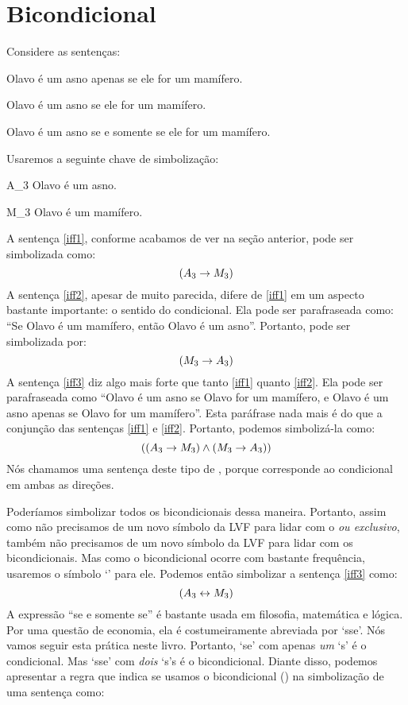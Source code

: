\section{Bicondicional}
Considere as sentenças:
	\begin{earg}
		\item[\ex{iff1}] Olavo é um asno apenas se ele for um mamífero.
		\item[\ex{iff2}] Olavo é um asno se ele for um mamífero.
		\item[\ex{iff3}] Olavo é um asno se e somente se ele for um mamífero.
	\end{earg}
Usaremos a seguinte chave de simbolização:
	\begin{ekey}
		\item[A_3] Olavo é um asno.
		\item[M_3] Olavo é um mamífero.
	\end{ekey}
A sentença \ref{iff1}, conforme acabamos de ver na seção anterior, pode ser simbolizada como:
$$(A_3 \rightarrow M_3)$$
A sentença \ref{iff2}, apesar de muito parecida, difere de \ref{iff1} em um aspecto bastante importante:
o sentido do condicional.
Ela pode ser parafraseada como:
``Se Olavo é um mamífero, então Olavo é um asno''.
Portanto, pode ser simbolizada por:
$$(M_3 \rightarrow A_3)$$
A sentença \ref{iff3} diz algo mais forte que tanto \ref{iff1} quanto \ref{iff2}.
Ela pode ser parafraseada como ``Olavo é um asno se Olavo for um mamífero, e Olavo é um asno apenas se Olavo for um mamífero''.
Esta paráfrase nada mais é do que a conjunção das sentenças \ref{iff1} e \ref{iff2}.
Portanto, podemos simbolizá-la como:
$$((A_3 \rightarrow M_3) \wedge (M_3 \rightarrow A_3))$$
Nós chamamos uma sentença deste tipo de , porque corresponde ao condicional em ambas as direções.

Poderíamos simbolizar todos os bicondicionais dessa maneira.
Portanto, assim como não precisamos de um novo símbolo da LVF para lidar com o \emph{ou exclusivo}, também não precisamos de um novo símbolo da LVF para lidar com os bicondicionais.
Mas como o bicondicional ocorre com bastante frequência, usaremos o símbolo `\eiff' para ele.
Podemos então simbolizar a sentença \ref{iff3} como:
$$(A_3 \leftrightarrow M_3)$$
A expressão ``se e somente se'' é bastante usada em filosofia, matemática e lógica.
Por uma questão de economia, ela é costumeiramente abreviada por `sse'.
Nós vamos seguir esta prática neste livro.
Portanto, `se' com apenas \emph{um} `s' é o condicional.
Mas `sse' com \emph{dois} `s's é o bicondicional.
Diante disso, podemos apresentar a regra que indica se usamos o bicondicional (\eiff) na simbolização de uma sentença como:


